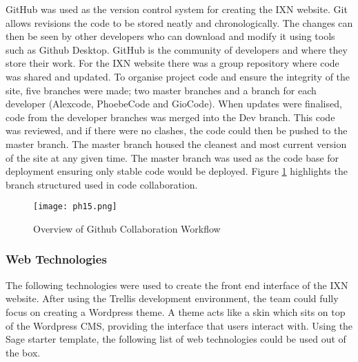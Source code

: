 \documentclass[fontsize=11pt]{extarticle}
\numberwithin{figure}{section} %
\numberwithin{table}{section}%
\begin{document}
GitHub was used as the version control system for creating the IXN
website. Git allows revisions the code to be stored neatly and
chronologically. The changes can then be seen by other developers who
can download and modify it using tools such as Github Desktop.
\cite{p20} GitHub is the community of developers and where they store
their work. For the IXN website there was a group repository where code
was shared and updated. To organise project code and ensure the
integrity of the site, five branches were made; two master branches and
a branch for each developer (Alexcode, PhoebeCode and GioCode). When
updates were finalised, code from the developer branches was merged into
the Dev branch. This code was reviewed, and if there were no clashes,
the code could then be pushed to the master branch. The master branch
housed the cleanest and most current version of the site at any given
time. The master branch was used as the code base for deployment
ensuring only stable code would be deployed. Figure \ref{githubcollab}
highlights the branch structured used in code collaboration.

\begin{figure}[H]
    \centering
    \texttt{[image: ph15.png]}
    \caption{Overview of Github Collaboration Workflow}
  \label{githubcollab}
\end{figure}

\hypertarget{web-technologies}{%
\subsubsection{Web Technologies}\label{web-technologies}}

The following technologies were used to create the front end interface
of the IXN website. After using the Trellis development environment, the
team could fully focus on creating a Wordpress theme. A theme acts like
a skin which sits on top of the Wordpress CMS, providing the interface
that users interact with. Using the Sage starter template, the following
list of web technologies could be used out of the box.
\end{document}
